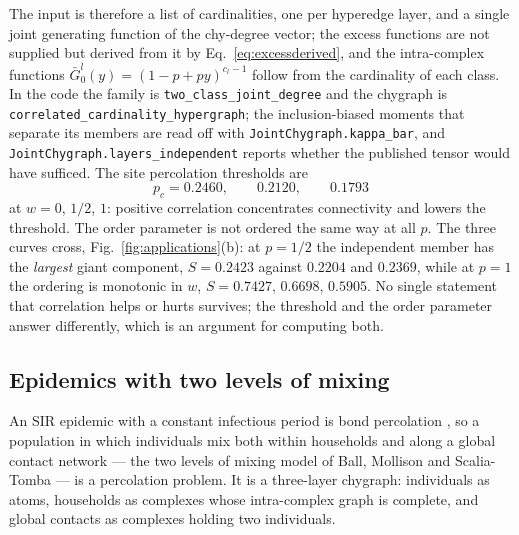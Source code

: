 \documentclass[aps,pre,twocolumn,superscriptaddress,floatfix,longbibliography]{revtex4-2}
\newcommand{\code}[1]{\texttt{#1}}
\begin{document}
The input is therefore a list of cardinalities, one per hyperedge layer, and a
single joint generating function of the chy-degree vector; the excess functions
are not supplied but derived from it by Eq.~\eqref{eq:excessderived}, and the
intra-complex functions $\bar G^l_0(y)=(1-p+py)^{c_l-1}$ follow from the
cardinality of each class. In the code the family is
\code{two\_class\_joint\_degree} and the chygraph is
\code{correlated\_cardinality\_hypergraph}; the inclusion-biased moments that
separate its members are read off with \code{JointChygraph.kappa\_bar}, and
\code{JointChygraph.layers\_independent} reports whether the published tensor
would have sufficed. The site percolation thresholds are
\begin{equation}
  p_c=0.2460,\qquad 0.2120,\qquad 0.1793
\end{equation}
at $w=0$, $1/2$, $1$: positive correlation concentrates connectivity and lowers
the threshold. The order parameter is not ordered the same way at all $p$. The
three curves cross, Fig.~\ref{fig:applications}(b): at $p=1/2$ the independent
member has the \emph{largest} giant component, $S=0.2423$ against $0.2204$
and $0.2369$, while at $p=1$ the ordering is monotonic in $w$, $S=0.7427$, $0.6698$,
$0.5905$. No single statement that correlation helps or hurts survives; the
threshold and the order parameter answer differently, which is an argument for
computing both.

\subsection{Epidemics with two levels of mixing}

An SIR epidemic with a constant infectious period is bond percolation
\cite{newman2002}, so a population in which individuals mix both within
households and along a global contact network --- the two levels of mixing model
of Ball, Mollison and Scalia-Tomba \cite{ball1997,ball2010} --- is a percolation
problem. It is a three-layer chygraph: individuals as atoms, households as
complexes whose intra-complex graph is complete, and global contacts as
complexes holding two individuals.
\end{document}
